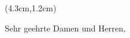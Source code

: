 \documentclass[DINmtext, pagenumber=false, parskip=half,%
               fromalign=left, fromphone=true,%
               fromemail=true, fromurl=true, %
               fromlogo=true, fromrule=false,
               firstfoot=false,%
               subject=beforeopening,%
               ]{scrlttr2}
\def\openingtext{Sehr geehrter Herr \usekomavar{toname},}
\def\openingtext{Sehr geehrte Frau \usekomavar{toname},}
\def\openingtext{Sehr geehrte Damen und Herren,}
\def\openingtext{Sehr geehrte Damen und Herren,}
\begin{document}
\begin{letter}{}
\begin{textblock*}{3cm}(4.3cm,1.2cm)
\end{textblock*}
\opening{\openingtext}
\lhead{}
\thispagestyle{fancy}



\end{letter}

 \let\clearpage\relax
\end{document}
